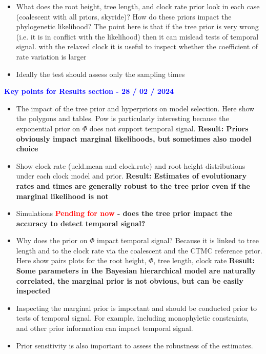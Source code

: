 \documentclass[11pt]{article}
\begin{document}
\begin{itemize}
	\item What does the root height, tree length, and clock rate prior look in each case (coalescent with all priors, skyride)?
	\subitem How do these priors impact the phylogenetic likelihood? The point here is that if the tree prior is very wrong (i.e. it is in conflict with the likelihood) then it can mislead tests of temporal signal.
	\subitem with the relaxed clock it is useful to inspect whether the coefficient of rate variation is larger
	\item Ideally the test should assess only the sampling times
	
\end{itemize}

\textbf{\textcolor{blue}{Key points for Results section - 28 / 02 / 2024}}
\begin{itemize}
	\item The impact of the tree prior and hyperpriors on model selection. Here show the polygons and tables. Pow is particularly interesting because the exponential prior on $\Phi$ does not support temporal signal. \textbf{Result: Priors obviously impact marginal likelihoods, but sometimes also model choice}
	\item Show clock rate (ucld.mean and clock.rate) and root height distributions under each clock model and prior. \textbf{Result: Estimates of evolutionary rates and times are generally robust to the tree prior even if the marginal likelihood is not}
	\item Simulations \textbf{\textcolor{red}{Pending for now} - does the tree prior impact the accuracy to detect temporal signal?}
	\item Why does the prior on $\Phi$ impact temporal signal? Because it is linked to tree length and to the clock rate via the coalescent and the CTMC reference prior. Here show pairs plots for the root height, $\Phi$, tree length, clock rate \textbf{Result: Some parameters in the Bayesian hierarchical model are naturally correlated, the marginal prior is not obvious, but can be easily inspected}
	\item Inspecting the marginal prior is important and should be conducted prior to tests of temporal signal. For example, including monophyletic constraints, and other prior information can impact temporal signal. 
	\item Prior sensitivity is also important to assess the robustness of the estimates.
\end{itemize}
\end{document}
